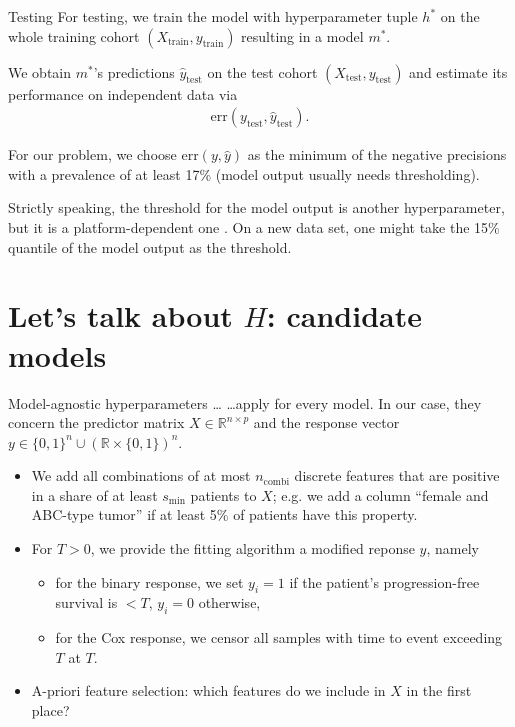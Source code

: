 \documentclass[10pt, aspectratio=169]{beamer}
\def\RR{\mathbb{R}}
\begin{document}
\begin{frame}{Testing}
  For testing, we train the model with hyperparameter tuple $h^*$ on the whole
  training cohort $(X_\text{train}, y_{\text{train}})$ resulting in a model $m^*$.

  We obtain $m^*$'s predictions $\hat{y}_{\text{test}}$ on the test cohort 
  $(X_{\text{test}}, y_{\text{test}})$ and estimate 
  its performance on independent data via
  \begin{align*}
    \text{err}(y_{\text{test}}, \hat{y}_{\text{test}}).
  \end{align*}

  \pause
  For our problem, we choose $\text{err}(y, \hat{y})$ as the minimum of the 
  negative precisions with a prevalence of at least 17\% (model output usually 
  needs thresholding).

  \pause
  Strictly speaking, the threshold for the model output is another hyperparameter, 
  but it is a platform-dependent one \citep{transplatform17}. On a new data set, 
  one might take the 15\% quantile of the model output as the threshold.
\end{frame}

\section{Let's talk about $H$: candidate models}

\begin{frame}{Model-agnostic hyperparameters \ldots}
  \ldots apply for every model. In our case, they concern the predictor matrix 
  $X \in \RR^{n \times p}$ and the response vector $y \in \{ 0, 1 \}^n \cup 
  (\RR \times \{0, 1 \})^n$.

  \begin{itemize}
    \item We add all combinations of at most $n_{\text{combi}}$ discrete features 
      that are positive in a share of at least $s_{\text{min}}$ patients to $X$; e.g. 
      we add a column ``female and ABC-type tumor'' if at least 5\% of patients 
      have this property.
    \pause
    \item For $T > 0$, we provide the fitting algorithm a modified reponse $y$, namely
      \begin{itemize}
        \item for the binary response, we set $y_i = 1$ if the patient's progression-free 
          survival is $< T$, $y_i = 0$ otherwise,
        \item for the Cox response, we censor all samples with time to event 
          exceeding $T$ at $T$.
      \end{itemize}
    \pause
    \item A-priori feature selection: which features do we include in $X$ in the 
      first place?
  \end{itemize}
\end{frame}
\end{document}
